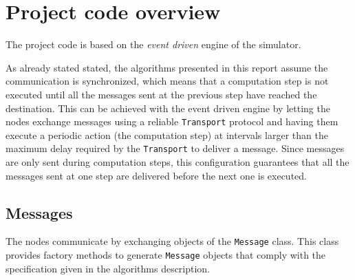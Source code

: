 
\section{Project code overview} \label{sec:code}


The project code is based on the \emph{event driven} engine of the \peersim{} \cite{peersim} simulator.

As already stated stated, the algorithms presented in this report assume the communication is synchronized, which means that a computation step is not executed until all the messages sent at the previous step have reached the destination. This can be achieved with the event driven engine by letting the nodes exchange messages using a reliable \texttt{Transport} protocol and having them execute a periodic action (the computation step) at intervals larger than the maximum delay required by the \texttt{Transport} to deliver a message. Since messages are only sent during computation steps, this configuration guarantees that all the messages sent at one step are delivered before the next one is executed.


\subsection{Messages}

The nodes communicate by exchanging objects of the \texttt{Message} class. This class provides factory methods to generate \texttt{Message} objects that comply with the specification given in the algorithms description.

